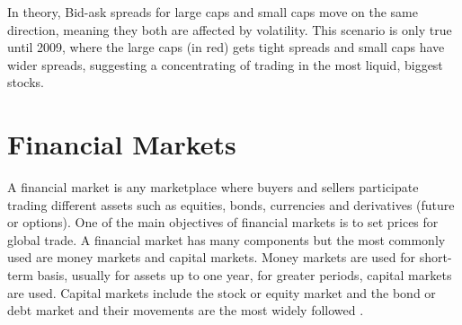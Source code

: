 In theory, Bid-ask spreads for large caps and small caps move on the same
direction, meaning they both are affected by volatility. This scenario is only
true until 2009, where the large caps (in red) gets tight spreads and small caps
have wider  spreads, suggesting a concentrating of trading in the most liquid,
biggest stocks. 

\section{Financial Markets}

A financial market is any marketplace where buyers and sellers participate
trading different assets such as equities, bonds, currencies and derivatives
(future or options). One of the main objectives of financial markets is to set
prices for global trade.
A financial market has many components but the most commonly used are money
markets and capital markets. Money markets are used for short-term basis,
usually for assets up to one year, for greater periods, capital markets are used.
Capital markets include the stock or equity market and the bond or debt market
and their movements are the most widely followed \cite{aldridge2009}.


